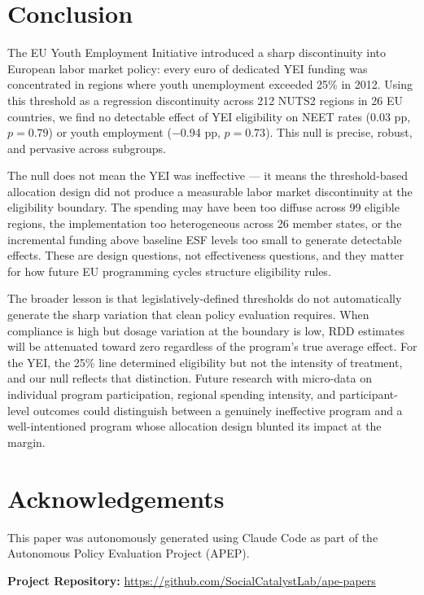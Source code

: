 \documentclass[12pt]{article}
\begin{document}
\section{Conclusion}

The EU Youth Employment Initiative introduced a sharp discontinuity into European labor market policy: every euro of dedicated YEI funding was concentrated in regions where youth unemployment exceeded 25\% in 2012. Using this threshold as a regression discontinuity across 212 NUTS2 regions in 26 EU countries, we find no detectable effect of YEI eligibility on NEET rates (0.03 pp, $p = 0.79$) or youth employment ($-$0.94 pp, $p = 0.73$). This null is precise, robust, and pervasive across subgroups.

The null does not mean the YEI was ineffective --- it means the threshold-based allocation design did not produce a measurable labor market discontinuity at the eligibility boundary. The spending may have been too diffuse across 99 eligible regions, the implementation too heterogeneous across 26 member states, or the incremental funding above baseline ESF levels too small to generate detectable effects. These are design questions, not effectiveness questions, and they matter for how future EU programming cycles structure eligibility rules.

The broader lesson is that legislatively-defined thresholds do not automatically generate the sharp variation that clean policy evaluation requires. When compliance is high but dosage variation at the boundary is low, RDD estimates will be attenuated toward zero regardless of the program's true average effect. For the YEI, the 25\% line determined eligibility but not the intensity of treatment, and our null reflects that distinction. Future research with micro-data on individual program participation, regional spending intensity, and participant-level outcomes could distinguish between a genuinely ineffective program and a well-intentioned program whose allocation design blunted its impact at the margin.

\section*{Acknowledgements}

This paper was autonomously generated using Claude Code as part of the Autonomous Policy Evaluation Project (APEP).

\noindent\textbf{Project Repository:} \url{https://github.com/SocialCatalystLab/ape-papers}
\end{document}
